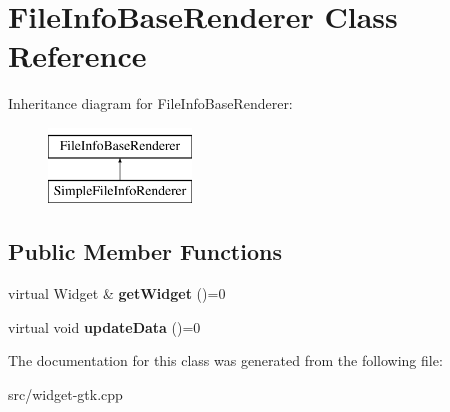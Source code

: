 \hypertarget{classFileInfoBaseRenderer}{\section{\-File\-Info\-Base\-Renderer \-Class \-Reference}
\label{classFileInfoBaseRenderer}
}
\-Inheritance diagram for \-File\-Info\-Base\-Renderer\-:\begin{figure}[H]
\begin{center}
\leavevmode
\includegraphics[height=2.000000cm]{classFileInfoBaseRenderer}
\end{center}
\end{figure}
\subsection*{\-Public \-Member \-Functions}
\begin{DoxyCompactItemize}
\item 
\hypertarget{classFileInfoBaseRenderer_a389e1e44729446b6b2263b86f934b2b6}{virtual \-Widget \& {\bfseries get\-Widget} ()=0}\label{classFileInfoBaseRenderer_a389e1e44729446b6b2263b86f934b2b6}

\item 
\hypertarget{classFileInfoBaseRenderer_a4aece1f02eae32c6eb0fd01376496c0e}{virtual void {\bfseries update\-Data} ()=0}\label{classFileInfoBaseRenderer_a4aece1f02eae32c6eb0fd01376496c0e}

\end{DoxyCompactItemize}


\-The documentation for this class was generated from the following file\-:\begin{DoxyCompactItemize}
\item 
src/widget-\/gtk.\-cpp\end{DoxyCompactItemize}
